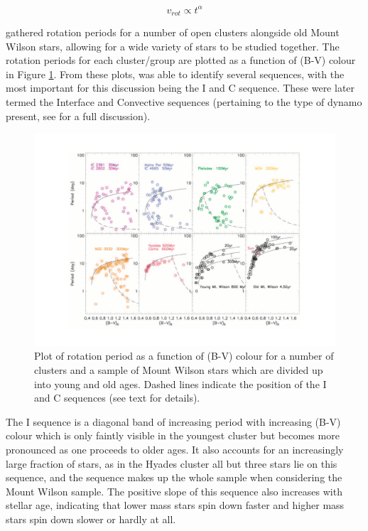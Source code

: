 \begin{equation}
    v_{rot} \propto t^{\alpha}
    \label{Eq:general_rotation_age}
\end{equation}

\citet{Barnes_2003} gathered rotation periods for a number of open clusters alongside old Mount Wilson stars, allowing for a wide variety of stars to be studied together. The rotation periods for each cluster/group are plotted as a function of (B-V) colour in Figure \ref{fig:barnes_2003_plot}. From these plots, \citet{Barnes_2003} was able to identify several sequences, with the most important for this discussion being the I and C sequence. These were later termed the Interface and Convective sequences (pertaining to the type of dynamo present, see \citet{Barnes_2003} for a full discussion).

\begin{figure}
    \centering
    \includegraphics[scale=0.5]{Figures/2-Historical_overview/barnes_2003.pdf}
    \caption[Rotation period as function of colour for a number of clusters]{Plot of rotation period as a function of (B-V) colour for a number of clusters and a sample of Mount Wilson stars which are divided up into young and old ages. Dashed lines indicate the position of the I and C sequences (see text for details).}
    \label{fig:barnes_2003_plot}
\end{figure}

The I sequence is a diagonal band of increasing period with increasing (B-V) colour which is only faintly visible in the youngest cluster but becomes more pronounced as one proceeds to older ages. It also accounts for an increasingly large fraction of stars, as in the Hyades cluster all but three stars lie on this sequence, and the sequence makes up the whole sample when considering the Mount Wilson sample. The positive slope of this sequence also increases with stellar age, indicating that lower mass stars spin down faster and higher mass stars spin down slower or hardly at all.

